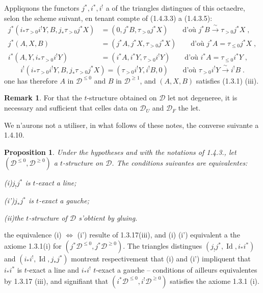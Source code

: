 \documentclass[12pt,a4paper]{article}
\theoremstyle{plain}
\newtheorem{proposition}[theorem]{Proposition}
\theoremstyle{definition}
\newtheorem{remark}[theorem]{Remark}
\DeclareMathOperator{\Id}{Id}
\begin{document}
Appliquons the functors $j^*, i^*, i^!$ a of the triangles distingues of this octaedre, selon the scheme suivant, en tenant compte of (1.4.3.3) a (1.4.3.5):
\begin{align*}
j^*(i_*\tau_{>0}i^!Y, B, j_*\tau_{>0}j^*X) &= (0, j^*B, \tau_{>0}j^*X) \qquad\text{d'o\`u } j^*B \xrightarrow{\;\sim\;} \tau_{>0}j^*X\;,\\
j^*(A, X, B) &= (j^*A, j^*X, \tau_{>0}j^*X) \qquad\text{d'o\`u } j^*A = \tau_{\leqslant 0}j^*X\;,\\
i^*(A, Y, i_*\tau_{>0}i^!Y) &= (i^*A, i^*Y, \tau_{>0}i^!Y) \qquad\text{d'o\`u } i^*A = \tau_{\leqslant 0}i^*Y\;,
\end{align*}
\[
i^!(i_*\tau_{>0}i^!Y, B, j_*\tau_{>0}j^*X) = (\tau_{>0}i^!Y, i^!B, 0) \qquad\text{d'o\`u } \tau_{>0}i^!Y \xrightarrow{\;\sim\;} i^!B\;.
\]
one has therefore $A$ in $\mathcal{D}^{\leqslant 0}$ and $B$ in $\mathcal{D}^{\geqslant 1}$, and $(A, X, B)$ satisfies (1.3.1) (iii).

\begin{remark}\label{rem:1.4.11}
For that the $t$-structure obtained on $\mathcal{D}$ let not degeneree, it is necessary and sufficient that celles data on $\mathcal{D}_U$ and $\mathcal{D}_F$ the let.
\end{remark}

We n'aurons not a utiliser, in what follows of these notes, the converse suivante a 1.4.10.

\begin{proposition}\label{prop:1.4.12}
Under the hypotheses and with the notations of \emph{1.4.3.}, let $(\mathcal{D}^{\leqslant 0}, \mathcal{D}^{\geqslant 0})$ a $t$-structure on $\mathcal{D}$. The conditions suivantes are equivalentes:

\emph{(i)}\quad $j_!j^*$ is $t$-exact a line;

\emph{(i')}\quad $j_*j^*$ is $t$-exact a gauche;

\emph{(ii)}\quad the $t$-structure of $\mathcal{D}$ s'obtient by gluing.
\end{proposition}

the equivalence (i) $\Leftrightarrow$ (i') resulte of 1.3.17(iii), and (i) (i') equivalent a the axiome 1.3.1(i) for $(j^*\mathcal{D}^{\leqslant 0}, j^*\mathcal{D}^{\geqslant 0})$. The triangles distingues $(j_!j^*, \Id, i_*i^*)$ and $(i_*i^!, \Id, j_*j^*)$ montrent respectivement that (i) and (i') impliquent that $i_*i^*$ is $t$-exact a line and $i_*i^!$ $t$-exact a gauche -- conditions of ailleurs equivalentes by 1.3.17 (iii), and signifiant that $(i^*\mathcal{D}^{\leqslant 0}, i^!\mathcal{D}^{\geqslant 0})$ satisfies the axiome 1.3.1 (i).
\end{document}
